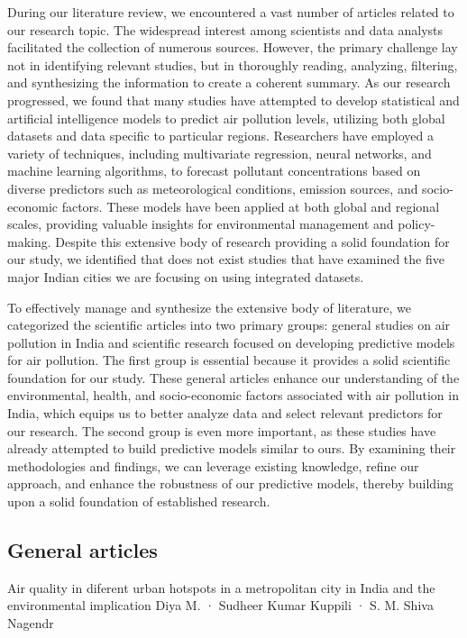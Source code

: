\documentclass[twoside,11pt]{article}
\begin{document}
During our literature review, we encountered a vast number of articles related to our research topic. The widespread interest among scientists and data analysts facilitated the collection of numerous sources. However, the primary challenge lay not in identifying relevant studies, but in thoroughly reading, analyzing, filtering, and synthesizing the information to create a coherent summary. As our research progressed, we found that many studies have attempted to develop statistical and artificial intelligence models to predict air pollution levels, utilizing both global datasets and data specific to particular regions. Researchers have employed a variety of techniques, including multivariate regression, neural networks, and machine learning algorithms, to forecast pollutant concentrations based on diverse predictors such as meteorological conditions, emission sources, and socio-economic factors. These models have been applied at both global and regional scales, providing valuable insights for environmental management and policy-making. Despite this extensive body of research providing a solid foundation for our study, we identified that does not exist studies that have examined the five major Indian cities we are focusing on using integrated datasets.

To effectively manage and synthesize the extensive body of literature, we categorized the scientific articles into two primary groups: general studies on air pollution in India and scientific research focused on developing predictive models for air pollution. The first group is essential because it provides a solid scientific foundation for our study. These general articles enhance our understanding of the environmental, health, and socio-economic factors associated with air pollution in India, which equips us to better analyze data and select relevant predictors for our research. The second group is even more important, as these studies have already attempted to build predictive models similar to ours. By examining their methodologies and findings, we can leverage existing knowledge, refine our approach, and enhance the robustness of our predictive models, thereby building upon a solid foundation of established research.

\subsection{General articles}
Air quality in diferent urban hotspots in a metropolitan city in India and the environmental implication Diya M. · Sudheer Kumar Kuppili · S. M. Shiva Nagendr
\end{document}
